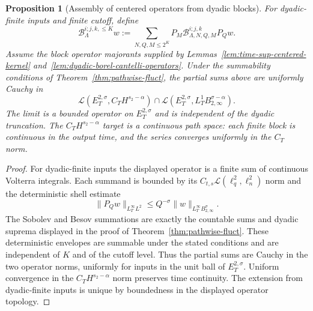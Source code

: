 \documentclass[10pt]{amsart}
\numberwithin{equation}{section}
\theoremstyle{plain}
\newtheorem{proposition}[theorem]{Proposition}
\theoremstyle{definition}
\theoremstyle{remark}
\begin{document}
\begin{proposition}[Assembly of centered operators from dyadic blocks]\label{prop:assemble-centered-operator}
For dyadic-finite inputs and finite cutoff, define
\[
        \mathcal B_{\Lambda}^{i;j,k,\le K}w
        :=\sum_{N,Q,M\le 2^K}P_M\mathcal B_{\Lambda,N,Q,M}^{i;j,k}P_Qw.
\]
Assume the block operator majorants supplied by Lemmas~\ref{lem:time-sup-centered-kernel} and~\ref{lem:dyadic-borel-cantelli-operators}.  Under the summability conditions of Theorem~\ref{thm:pathwise-fluct}, the partial sums above are uniformly Cauchy in
\[
        \mathcal L(E_T^{2,\sigma},C_TH^{s_2-\alpha})
        \cap
        \mathcal L(E_T^{2,\sigma},L_T^1B_{2,\infty}^{\sigma-\alpha}).
\]
The limit is a bounded operator on $E_T^{2,\sigma}$ and is independent of the dyadic truncation.  The $C_TH^{s_2-\alpha}$ target is a continuous path space: each finite block is continuous in the output time, and the series converges uniformly in the $C_T$ norm.
\end{proposition}

\begin{proof}
For dyadic-finite inputs the displayed operator is a finite sum of continuous Volterra integrals.  Each summand is bounded by its $C_{t,s}\mathcal L(\ell_q^2,\ell_n^2)$ norm and the deterministic shell estimate
\[
        \|P_Qw\|_{L_T^\infty L^2}\le Q^{-\sigma}\|w\|_{L_T^\infty B_{2,\infty}^{\sigma}}.
\]
The Sobolev and Besov summations are exactly the countable sums and dyadic suprema displayed in the proof of Theorem~\ref{thm:pathwise-fluct}.  These deterministic envelopes are summable under the stated conditions and are independent of $K$ and of the cutoff level.  Thus the partial sums are Cauchy in the two operator norms, uniformly for inputs in the unit ball of $E_T^{2,\sigma}$.  Uniform convergence in the $C_TH^{s_2-\alpha}$ norm preserves time continuity.  The extension from dyadic-finite inputs is unique by boundedness in the displayed operator topology.
\end{proof}
\end{document}
